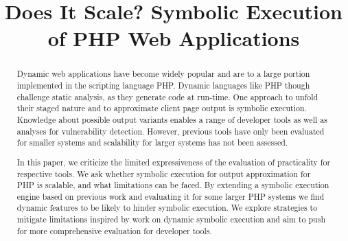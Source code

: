 \documentclass[sigconf, preprint]{acmart}
\begin{document}
\title{Does It Scale? Symbolic Execution of PHP Web Applications}


\affiliation{%
}

\affiliation{%
}

\affiliation{%
}


\renewcommand{\shortauthors}{
}


\begin{abstract}
Dynamic web applications have become widely popular and are to a large portion
implemented in the scripting language PHP. Dynamic languages like PHP though
challenge static analysis, as they generate code at run-time. One approach to unfold their
staged nature and to approximate client page output is symbolic execution.
Knowledge about possible output variants enables a range of developer tools as
well as analyses for vulnerability detection. However, previous tools have only
been evaluated for smaller systems and scalability for larger systems has not
been assessed.
 
In this paper, we criticize the limited expressiveness of the evaluation of
practicality for respective tools. We ask whether symbolic execution for output
approximation for PHP is scalable, and what limitations can be faced. By
extending a symbolic execution engine based on previous work and evaluating it
for some larger PHP systems we find dynamic features to be likely to hinder
symbolic execution. We explore strategies to mitigate limitations inspired by
work on dynamic symbolic execution and aim to push for more comprehensive
evaluation for developer tools.
\end{abstract}
\end{document}
